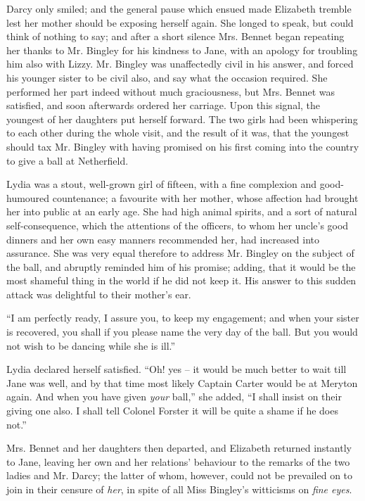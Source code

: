 Darcy only smiled; and the general pause which ensued
made Elizabeth tremble lest her mother should be exposing
herself again. She longed to speak, but could think of
nothing to say; and after a short silence Mrs. Bennet
began repeating her thanks to Mr. Bingley for his kindness
to Jane, with an apology for troubling him also with
Lizzy. Mr. Bingley was unaffectedly civil in his answer,
and forced his younger sister to be civil also, and say what
the occasion required. She performed her part indeed
without much graciousness, but Mrs. Bennet was satisfied,
and soon afterwards ordered her carriage. Upon this
signal, the youngest of her daughters put herself forward.
The two girls had been whispering to each other during
the whole visit, and the result of it was, that the youngest
should tax Mr. Bingley with having promised on his first
coming into the country to give a ball at Netherfield.

Lydia was a stout, well-grown girl of fifteen, with a fine
complexion and good-humoured countenance; a favourite
with her mother, whose affection had brought her into
public at an early age. She had high animal spirits, and
a sort of natural self-consequence, which the attentions
of the officers, to whom her uncle’s good dinners and
her own easy manners recommended her, had increased
into assurance. She was very equal therefore to address
Mr. Bingley on the subject of the ball, and abruptly
reminded him of his promise; adding, that it would be
the most shameful thing in the world if he did not keep it.
His answer to this sudden attack was delightful to their
mother’s ear.

“I am perfectly ready, I assure you, to keep my engagement;
and when your sister is recovered, you shall if you
please name the very day of the ball. But you would not
wish to be dancing while she is ill.”

Lydia declared herself satisfied. “Oh! yes -- it would
be much better to wait till Jane was well, and by that time
most likely Captain Carter would be at Meryton again.
And when you have given \textit{your} ball,” she added, “I shall
insist on their giving one also. I shall tell Colonel Forster
it will be quite a shame if he does not.”

Mrs. Bennet and her daughters then departed, and
Elizabeth returned instantly to Jane, leaving her own
and her relations’ behaviour to the remarks of the two
ladies and Mr. Darcy; the latter of whom, however,
could not be prevailed on to join in their censure of \textit{her},
in spite of all Miss Bingley’s witticisms on \textit{fine eyes}.

